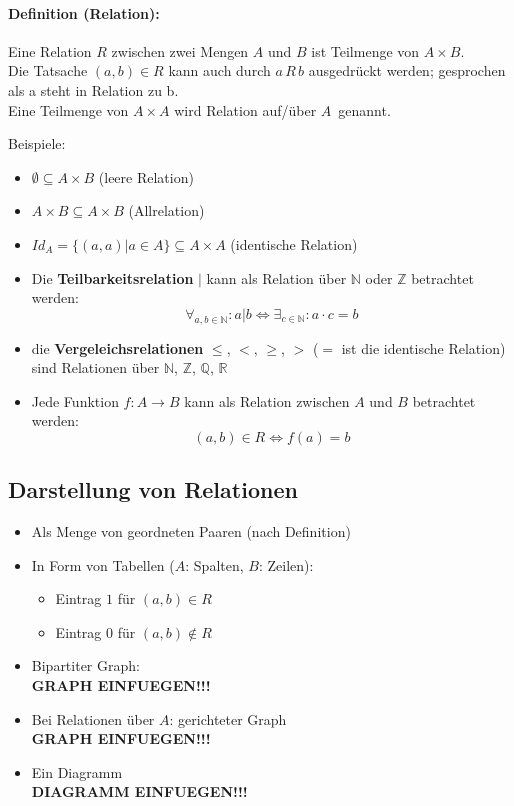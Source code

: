 \paragraph{Definition (Relation):}Eine Relation $R$ zwischen zwei Mengen $A$ und $B$ ist Teilmenge von $A\times B$.\\
Die Tatsache $(a,b)\in R$ kann auch durch $a\,R\,b$ ausgedrückt werden; gesprochen als \glqq a steht in Relation zu b\grqq .\\
Eine Teilmenge von $A\times A$ wird \glqq Relation auf/über $A$\grqq\ genannt.

Beispiele:
\begin{itemize}
\item $\emptyset \subseteq A\times B$ (leere Relation)
\item $A\times B \subseteq A\times B$ (Allrelation)
\item $Id_A = \{(a,a) | a\in A\} \subseteq A\times A$ (identische Relation)
\item Die \textbf{Teilbarkeitsrelation} $\mid$ kann als Relation über $\mathbb{N}$ oder $\mathbb{Z}$ betrachtet werden:
\[
\forall_{a,b\in\mathbb{N}}: a|b \Leftrightarrow \exists_{c\in\mathbb{N}}: a\cdot c = b
\]
\item die \textbf{Vergeleichsrelationen} $\leq$, $<$, $\geq$, $>$ ($=$ ist die identische Relation) sind Relationen über $\mathbb{N}$, $\mathbb{Z}$, $\mathbb{Q}$, $\mathbb{R}$
\item Jede Funktion $f:A\rightarrow B$ kann als Relation zwischen $A$ und $B$ betrachtet werden:
\[
(a,b)\in R \Leftrightarrow f(a)=b
\]
\end{itemize}

\subsection{Darstellung von Relationen}
\begin{itemize}
\item Als Menge von geordneten Paaren (nach Definition)
\item In Form von Tabellen ($A$: Spalten, $B$: Zeilen):
\begin{itemize}
\item Eintrag $1$ für $(a,b)\in R$
\item Eintrag $0$ für $(a,b)\not\in R$
\end{itemize}
\item Bipartiter Graph:\\
\textbf{GRAPH EINFUEGEN!!!}
\item Bei Relationen über $A$: gerichteter Graph\\
\textbf{GRAPH EINFUEGEN!!!}
\item Ein Diagramm\\
\textbf{DIAGRAMM EINFUEGEN!!!}
\end{itemize}

